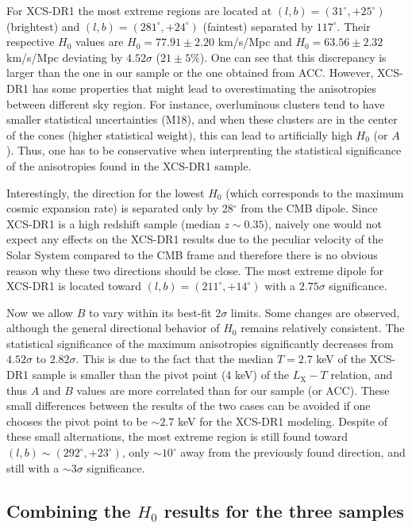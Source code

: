 \documentclass{aa}   %
\begin{document}
For XCS-DR1 the most extreme regions are located at $(l,b)=(31^{\circ}, +25^{\circ})$ (brightest) and $(l,b)=(281^{\circ}, +24^{\circ})$ (faintest) separated by $117^{\circ}$. Their respective $H_0$ values are $H_0=77.91\pm2.20$ km/s/Mpc and $H_0=63.56\pm 2.32$ km/s/Mpc deviating by $4.52\sigma$ ($21\pm5\%$). One can see that this discrepancy is larger than the one in our sample or the one obtained from ACC. However, XCS-DR1 has some properties that might lead to overestimating the anisotropies between different sky region. For instance, overluminous clusters tend to have smaller statistical uncertainties (M18), and when these clusters are in the center of the cones (higher statistical weight), this can lead to artificially high $H_0$ (or $A$). Thus, one has to be conservative when interprenting the statistical significance of the anisotropies found in the XCS-DR1 sample.

Interestingly, the direction for the lowest $H_0$ (which corresponds to the maximum cosmic expansion rate) is separated only by 28$^{\circ}$ from the CMB dipole. Since XCS-DR1 is a high redshift sample (median $z\sim0.35$), naively one would not expect any effects on the XCS-DR1 results due to the peculiar velocity of the Solar System compared to the CMB frame and therefore there is no obvious reason why these two directions should be close. The most extreme dipole for XCS-DR1 is located toward $(l,b)=(211^{\circ}, +14^{\circ})$ with a $2.75\sigma$ significance.

Now we allow $B$ to vary within its best-fit $2\sigma$ limits. Some changes are observed, although the general directional behavior of $H_0$ remains relatively consistent. The statistical significance of the maximum anisotropies significantly decreases from $4.52\sigma$ to $2.82\sigma$. This is due to the fact that the median $T=2.7$ keV of the XCS-DR1 sample is smaller than the pivot point (4 keV) of the $L_{\text{X}}-T$ relation, and thus $A$ and $B$ values are more correlated than for our sample (or ACC). These small differences between the results of the two cases can be avoided if one chooses the pivot point to be $\sim 2.7$ keV for the XCS-DR1 modeling. Despite of these small alternations, the most extreme region is still found toward $(l,b)\sim (292^{\circ}, +23^{\circ})$, only $\sim 10^{\circ}$ away from the previously found direction, and still with a $\sim 3\sigma$ significance.

\subsection{Combining the $H_0$ results for the three samples}
\end{document}
